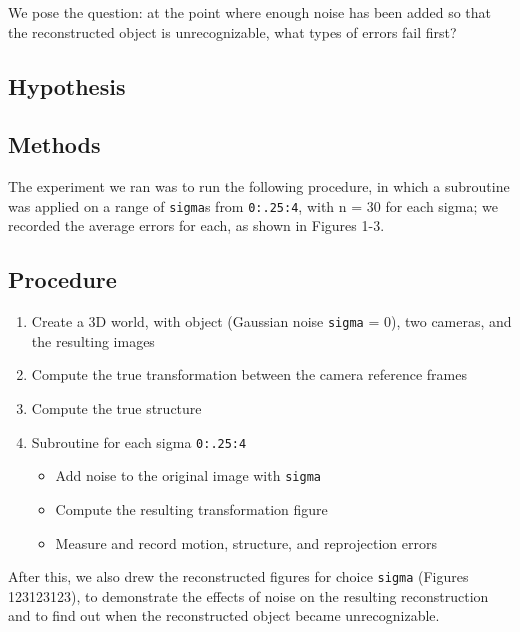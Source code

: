 \documentclass{article}
\begin{document}
We pose the question: at the point where enough noise has been added so that the reconstructed object is unrecognizable, what types of errors fail first?


\subsection{Hypothesis}


\subsection{Methods}

The experiment we ran was to run the following procedure, in which a subroutine was applied on a range of \texttt{sigma}s from \texttt{0:.25:4}, with n = 30 for each sigma; we recorded the average errors for each, as shown in Figures 1-3.

\subsection*{Procedure}

\begin{enumerate}
  \item Create a 3D world, with object (Gaussian noise \texttt{sigma} = 0), two cameras, and the resulting images
  \item Compute the true transformation between the camera reference frames
  \item Compute the true structure
  \item Subroutine for each sigma \texttt{0:.25:4}
  \begin{itemize}
  	\item Add noise to the original image with \texttt{sigma}
  	\item Compute the resulting transformation figure
  	\item Measure and record motion, structure, and reprojection errors
  \end{itemize}
\end{enumerate} 

After this, we also drew the reconstructed figures for choice \texttt{sigma} (Figures 123123123), to demonstrate the effects of noise on the resulting reconstruction and to find out when the reconstructed object became unrecognizable.

\end{document}

